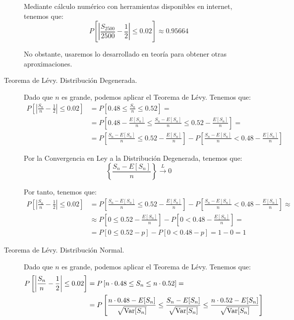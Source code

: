 \begin{ejercicio}
\begin{description}
        Mediante cálculo numérico con herramientas disponibles en internet, tenemos que:
        \begin{equation*}
            P\left[\left|\frac{S_{2500}}{2500} - \frac{1}{2}\right| \leq 0.02\right] \approx 0.95664
        \end{equation*}

        No obstante, usaremos lo desarrollado en teoría para obtener otras aproximaciones.

        \item [Teorema de Lévy. Distribución Degenerada.] Dado que $n$ es grande, podemos aplicar el Teorema de Lévy. Tenemos que:
        \begin{align*}
            P\left[\left|\frac{S_{n}}{n} - \frac{1}{2}\right| \leq 0.02\right] &= 
            P\left[0.48 \leq \frac{S_{n}}{n} \leq 0.52\right]
            =\\&= P\left[0.48 - \frac{E[S_{n}]}{n} \leq \frac{S_{n}-E[S_n]}{n} \leq 0.52 - \frac{E[S_{n}]}{n}\right]
            = \\&= P\left[\frac{S_{n}-E[S_n]}{n} \leq 0.52 - \frac{E[S_{n}]}{n}\right] - P\left[\frac{S_{n}-E[S_n]}{n} < 0.48 - \frac{E[S_{n}]}{n}\right]
        \end{align*}

        Por la Convergencia en Ley a la Distribución Degenerada, tenemos que:
        \begin{equation*}
            \left\{\frac{S_{n}-E[S_n]}{n}\right\}\xrightarrow{L} 0
        \end{equation*}
        
        Por tanto, tenemos que:
        \begin{align*}
            P\left[\left|\frac{S_{n}}{n} - \frac{1}{2}\right| \leq 0.02\right] &= 
            P\left[\frac{S_{n}-E[S_n]}{n} \leq 0.52 - \frac{E[S_{n}]}{n}\right] - P\left[\frac{S_{n}-E[S_n]}{n} < 0.48 - \frac{E[S_{n}]}{n}\right]
            \approx \\&\approx P\left[0 \leq 0.52 - \frac{E[S_{n}]}{n}\right] - P\left[0 < 0.48 - \frac{E[S_{n}]}{n}\right]
            = \\&= P\left[0 \leq 0.52 - p\right] - P\left[0 < 0.48 - p\right]
            = 1 - 0 = 1
        \end{align*}

        \item [Teorema de Lévy. Distribución Normal.] Dado que $n$ es grande, podemos aplicar el Teorema de Lévy. Tenemos que:
        \begin{align*}
            P\left[\left|\frac{S_{n}}{n} - \frac{1}{2}\right| \leq 0.02\right] &= 
            P\left[n\cdot 0.48 \leq S_{n} \leq n\cdot 0.52\right]
            =\\&= P\left[\frac{n\cdot 0.48 - E[S_{n}]}{\sqrt{\operatorname{Var}[S_{n}]}} \leq \frac{S_{n}-E[S_n]}{\sqrt{\operatorname{Var}[S_{n}]}} \leq \frac{n\cdot 0.52 - E[S_{n}]}{\sqrt{\operatorname{Var}[S_{n}]}}\right]
        \end{align*}


\end{description}
\end{ejercicio}
